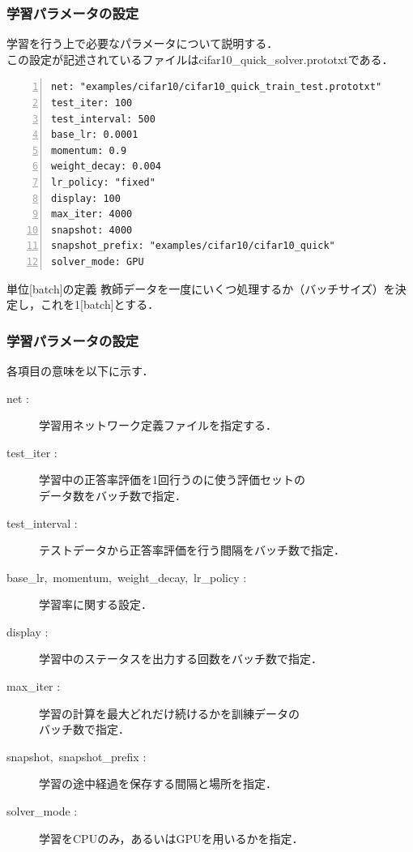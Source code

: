 \documentclass[dvipdfmx,11pt,notheorems]{beamer}
\theoremstyle{definition}
\begin{document}


\begin{frame}[fragile]\frametitle{学習パラメータの設定}
学習を行う上で必要なパラメータについて説明する．\\この設定が記述されているファイルはcifar10\_quick\_solver.prototxtである．

\begin{lstlisting}[basicstyle=\ttfamily\footnotesize, frame=single, firstnumber=1, numbers=left, breaklines=true]
net: "examples/cifar10/cifar10_quick_train_test.prototxt"
test_iter: 100
test_interval: 500
base_lr: 0.0001
momentum: 0.9
weight_decay: 0.004
lr_policy: "fixed"
display: 100
max_iter: 4000
snapshot: 4000
snapshot_prefix: "examples/cifar10/cifar10_quick"
solver_mode: GPU
\end{lstlisting}
\begin{exampleblock}{単位[batch]の定義}
教師データを一度にいくつ処理するか（バッチサイズ）を決定し，これを1[batch]とする．
\end{exampleblock}
\end{frame}

\begin{frame}[fragile]\frametitle{学習パラメータの設定}
各項目の意味を以下に示す．
\begin{description}
  \item[net :]学習用ネットワーク定義ファイルを指定する．
  \item[test\_iter :]学習中の正答率評価を1回行うのに使う評価セットの\\データ数をバッチ数で指定．
  \item[test\_interval :]テストデータから正答率評価を行う間隔をバッチ数で指定．
  \item[base\_lr,\ momentum,\ weight\_decay,\ lr\_policy :]学習率に関する設定．
  \item[display :]学習中のステータスを出力する回数をバッチ数で指定．
  \item[max\_iter :]学習の計算を最大どれだけ続けるかを訓練データの\\バッチ数で指定．
  \item[snapshot,\ snapshot\_prefix :]学習の途中経過を保存する間隔と場所を指定．
  \item[solver\_mode :]学習をCPUのみ，あるいはGPUを用いるかを指定．
\end{description}
\end{frame}
\end{document}

